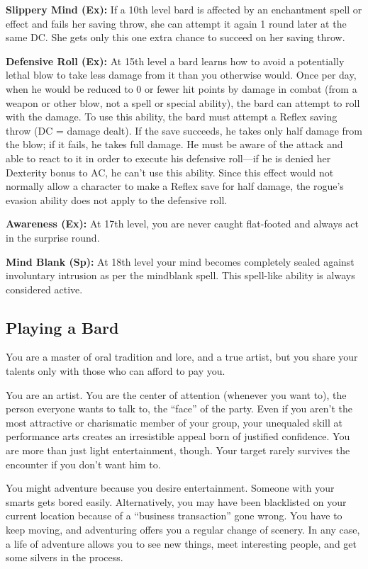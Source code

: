 \textbf{Slippery Mind (Ex):} If a 10th level bard is affected by an enchantment spell or effect and fails her saving throw, she can attempt it again 1 round later at the same DC. She gets only this one extra chance to succeed on her saving throw.

\textbf{Defensive Roll (Ex):} At 15th level a bard learns how to avoid a potentially lethal blow to take less damage from it than you otherwise would. Once per day, when he would be reduced to 0 or fewer hit points by damage in combat (from a weapon or other blow, not a spell or special ability), the bard can attempt to roll with the damage. To use this ability, the bard must attempt a Reflex saving throw (DC = damage dealt). If the save succeeds, he takes only half damage from the blow; if it fails, he takes full damage. He must be aware of the attack and able to react to it in order to execute his defensive roll---if he is denied her Dexterity bonus to AC, he can't use this ability. Since this effect would not normally allow a character to make a Reflex save for half damage, the rogue's evasion ability does not apply to the defensive roll.

\textbf{Awareness (Ex):} At 17th level, you are never caught flat-footed and always act in the surprise round.

\textbf{Mind Blank (Sp):} At 18th level your mind becomes completely sealed against involuntary intrusion as per the mindblank spell. This spell-like ability is always considered active.

\subsection{Playing a Bard}

You are a master of oral tradition and lore, and a true artist, but you share your talents only with those who can afford to pay you.

You are an artist. You are the center of attention (whenever you want to), the person everyone wants to talk to, the ``face'' of the party. Even if you aren't the most attractive or charismatic member of your group, your unequaled skill at performance arts creates an irresistible appeal born of justified confidence. You are more than just light entertainment, though. Your target rarely survives the encounter if you don't want him to.

You might adventure because you desire entertainment. Someone with your smarts gets bored easily. Alternatively, you may have been blacklisted on your current location because of a ``business transaction'' gone wrong. You have to keep moving, and adventuring offers you a regular change of scenery. In any case, a life of adventure allows you to see new things, meet interesting people, and get some silvers in the process.

